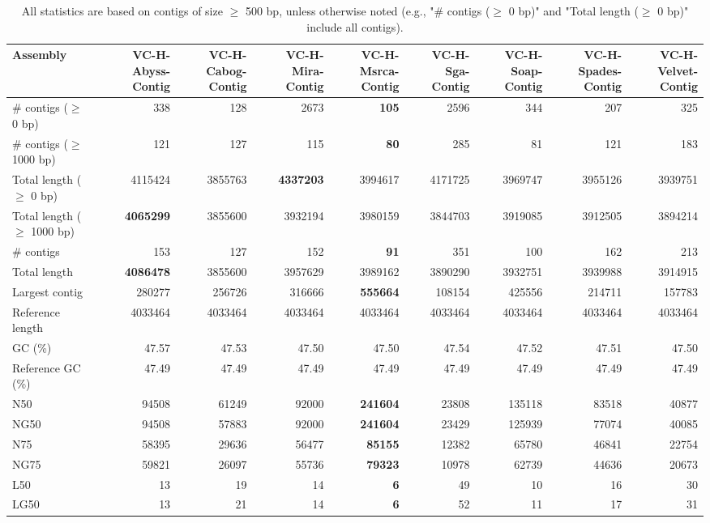 \documentclass[12pt,a4paper]{article}
\begin{document}
\begin{table}[ht]
\begin{center}
\caption{All statistics are based on contigs of size $\geq$ 500 bp, unless otherwise noted (e.g., "\# contigs ($\geq$ 0 bp)" and "Total length ($\geq$ 0 bp)" include all contigs).}
\begin{tabular}{|l*{8}{|r}|}
\hline
Assembly & VC-H-Abyss-Contig & VC-H-Cabog-Contig & VC-H-Mira-Contig & VC-H-Msrca-Contig & VC-H-Sga-Contig & VC-H-Soap-Contig & VC-H-Spades-Contig & VC-H-Velvet-Contig \\ \hline
\# contigs ($\geq$ 0 bp) & 338 & 128 & 2673 & {\bf 105} & 2596 & 344 & 207 & 325 \\ \hline
\# contigs ($\geq$ 1000 bp) & 121 & 127 & 115 & {\bf 80} & 285 & 81 & 121 & 183 \\ \hline
Total length ($\geq$ 0 bp) & 4115424 & 3855763 & {\bf 4337203} & 3994617 & 4171725 & 3969747 & 3955126 & 3939751 \\ \hline
Total length ($\geq$ 1000 bp) & {\bf 4065299} & 3855600 & 3932194 & 3980159 & 3844703 & 3919085 & 3912505 & 3894214 \\ \hline
\# contigs & 153 & 127 & 152 & {\bf 91} & 351 & 100 & 162 & 213 \\ \hline
Total length & {\bf 4086478} & 3855600 & 3957629 & 3989162 & 3890290 & 3932751 & 3939988 & 3914915 \\ \hline
Largest contig & 280277 & 256726 & 316666 & {\bf 555664} & 108154 & 425556 & 214711 & 157783 \\ \hline
Reference length & 4033464 & 4033464 & 4033464 & 4033464 & 4033464 & 4033464 & 4033464 & 4033464 \\ \hline
GC (\%) & 47.57 & 47.53 & 47.50 & 47.50 & 47.54 & 47.52 & 47.51 & 47.50 \\ \hline
Reference GC (\%) & 47.49 & 47.49 & 47.49 & 47.49 & 47.49 & 47.49 & 47.49 & 47.49 \\ \hline
N50 & 94508 & 61249 & 92000 & {\bf 241604} & 23808 & 135118 & 83518 & 40877 \\ \hline
NG50 & 94508 & 57883 & 92000 & {\bf 241604} & 23429 & 125939 & 77074 & 40085 \\ \hline
N75 & 58395 & 29636 & 56477 & {\bf 85155} & 12382 & 65780 & 46841 & 22754 \\ \hline
NG75 & 59821 & 26097 & 55736 & {\bf 79323} & 10978 & 62739 & 44636 & 20673 \\ \hline
L50 & 13 & 19 & 14 & {\bf 6} & 49 & 10 & 16 & 30 \\ \hline
LG50 & 13 & 21 & 14 & {\bf 6} & 52 & 11 & 17 & 31 \\ \hline

\end{tabular}
\end{center}
\end{table}
\end{document}
